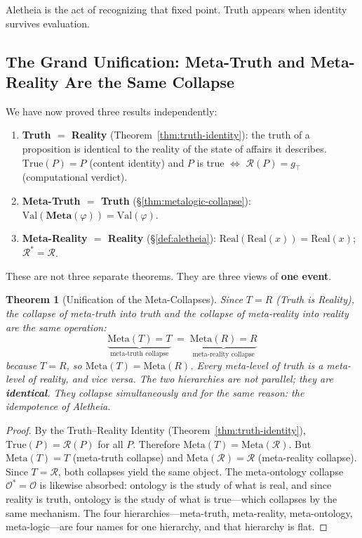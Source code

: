 \documentclass[12pt, letterpaper]{book}
\def\equiv{=}%
\def\mathfrak#1{#1}%
\newtheorem{theorem}{Theorem}[chapter]
\begin{document}
Aletheia is the act of recognizing that fixed point. Truth appears when identity survives evaluation.

\subsection{The Grand Unification: Meta-Truth and Meta-Reality Are the Same Collapse}

We have now proved three results independently:

\begin{enumerate}[label=(\roman*)]
    \item \textbf{Truth $\equiv$ Reality} (Theorem~\ref{thm:truth-identity}): the truth of a proposition is identical to the reality of the state of affairs it describes. $\mathrm{True}(P) \equiv P$ (content identity) and $P$ is true $\iff$ $\mathcal{R}(P) = \mathfrak{g}_\top$ (computational verdict).
    \item \textbf{Meta-Truth $\equiv$ Truth} (\S\ref{thm:metalogic-collapse}): $\mathrm{Val}(\mathbf{Meta}(\varphi)) \equiv \mathrm{Val}(\varphi)$.
    \item \textbf{Meta-Reality $\equiv$ Reality} (\S\ref{def:aletheia}): $\mathrm{Real}(\mathrm{Real}(x)) \equiv \mathrm{Real}(x)$; $\mathcal{R}^* \equiv \mathcal{R}$.
\end{enumerate}

These are not three separate theorems. They are three views of \textbf{one event}.

\begin{theorem}[Unification of the Meta-Collapses]\label{thm:grand-unification}
Since $T \equiv R$ (Truth is Reality), the collapse of meta-truth into truth and the collapse of meta-reality into reality are the same operation:
\[
\underbrace{\mathrm{Meta}(T) \equiv T}_{\text{meta-truth collapse}} \;\equiv\; \underbrace{\mathrm{Meta}(R) \equiv R}_{\text{meta-reality collapse}}
\]
because $T \equiv R$, so $\mathrm{Meta}(T) \equiv \mathrm{Meta}(R)$. Every meta-level of truth is a meta-level of reality, and vice versa. The two hierarchies are not parallel; they are \textbf{identical}. They collapse simultaneously and for the same reason: the idempotence of Aletheia.
\end{theorem}

\begin{proof}
By the Truth--Reality Identity (Theorem~\ref{thm:truth-identity}), $\mathrm{True}(P) \equiv \mathcal{R}(P)$ for all $P$. Therefore $\mathrm{Meta}(T) \equiv \mathrm{Meta}(\mathcal{R})$. But $\mathrm{Meta}(T) \equiv T$ (meta-truth collapse) and $\mathrm{Meta}(\mathcal{R}) \equiv \mathcal{R}$ (meta-reality collapse). Since $T \equiv \mathcal{R}$, both collapses yield the same object. The meta-ontology collapse $\mathcal{O}^* \equiv \mathcal{O}$ is likewise absorbed: ontology is the study of what is real, and since reality is truth, ontology is the study of what is true---which collapses by the same mechanism. The four hierarchies---meta-truth, meta-reality, meta-ontology, meta-logic---are four names for one hierarchy, and that hierarchy is flat.
\end{proof}
\end{document}
